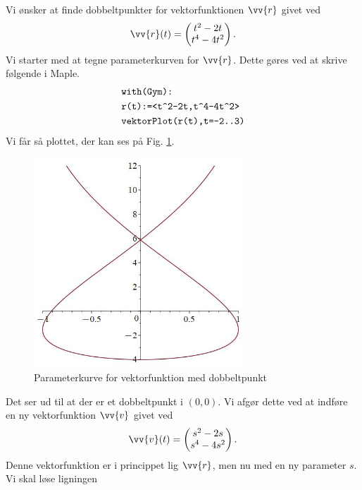 \begin{exa}
	Vi ønsker at finde dobbeltpunkter for vektorfunktionen $\vv{r}$ givet ved
	\begin{align*}
		\vv{r}(t) =
		\begin{pmatrix}
			t^2-2t \\
			t^4-4t^2
		\end{pmatrix}.
	\end{align*}
	Vi starter med at tegne parameterkurven for $\vv{r}$. Dette gøres ved at skrive følgende i Maple.
	\begin{align*}
		&\texttt{with(Gym):}\\
		&\texttt{r(t):=<t\string^2-2t,t\string^4-4t\string^2>}\\
		&\texttt{vektorPlot(r(t),t=-2..3)}
	\end{align*}
	Vi får så plottet, der kan ses på Fig. \ref{fig:dobbelt}.
	\begin{figure}[H]
		\centering
		\includegraphics[width=0.7\textwidth]{Billeder/dobbeltpunkt.jpg}
		\caption{Parameterkurve for vektorfunktion med dobbeltpunkt}
		\label{fig:dobbelt}
	\end{figure}
	Det ser ud til at der er et dobbeltpunkt i $(0,0)$. Vi afgør dette ved at indføre en ny vektorfunktion $\vv{v}$ givet ved
	\begin{align*}
		\vv{v}(t) =
		\begin{pmatrix}
			s^2-2s \\
			s^4-4s^2
		\end{pmatrix}.
	\end{align*}
	Denne vektorfunktion er i princippet lig $\vv{r}$, men nu med en ny parameter $s$. Vi skal løse ligningen
	\begin{align*}

\end{align*}
\end{exa}
